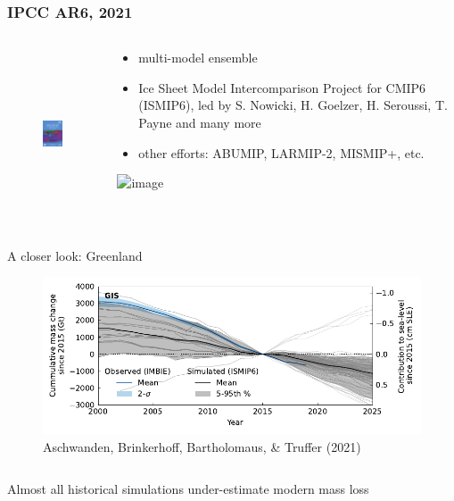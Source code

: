 \documentclass[hide notes,intlimits]{beamer}
\begin{document}
\begin{frame}
  \frametitle{IPCC AR6, 2021}
  \begin{columns}[c]
    \begin{column}{.4\linewidth}
      \begin{figure}
        \includegraphics[height=5cm]{ar6-wg1}
      \end{figure}
    \end{column}
    \begin{column}{.6\linewidth}
      \begin{itemize}
      \item multi-model ensemble
      \item Ice Sheet Model Intercomparison Project for CMIP6 (ISMIP6), led by S. Nowicki, H. Goelzer, H. Seroussi, T. Payne and many more
      \item other efforts: ABUMIP, LARMIP-2, MISMIP+, etc.
      \end{itemize}
        \includegraphics<1>[width=2.5cm]{ismip6_logo}
    \end{column}
  \end{columns}
\end{frame}



\begin{frame}{A closer look: Greenland}
  \begin{figure}
    \includegraphics[width=\textwidth]{GIS_historical}
    \caption{Aschwanden, Brinkerhoff, Bartholomaus, \& Truffer (2021)}
  \end{figure}
  \begin{columns}[c]
    \begin{column}{.5\textwidth}
      \begin{minipage}[t][.5\textheight][t]{\textwidth}
        \alert{Almost all historical simulations under-estimate modern mass loss}
      \end{minipage}
    \end{column}
    \begin{column}{.25\textwidth}
    \end{column}
  \end{columns}
\end{frame}
\end{document}
